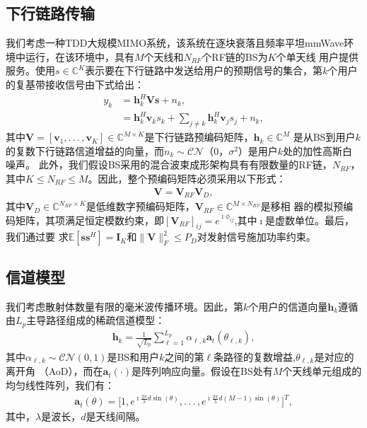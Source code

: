 \documentclass[10pt,journal,final]{IEEEtran}%
\begin{document}
\subsection{下行链路传输} %
我们考虑一种TDD大规模MIMO系统，该系统在逐块衰落且频率平坦mmWave环境中运行，在该环境中，具有$M$个天线和$N_{RF}$个RF链的BS为$K$个单天线
用户提供服务。使用$s\in\mathbb{C} ^{K}$表示要在下行链路中发送给用户的预期信号的集合，第$k$个用户的复基带接收信号由下式给出：
\vspace{-0.8em}
\begin{align}
y_{k}&=\mathbf{h}_{k}^{H} \mathbf{V} \mathbf{s} +n_{k},\nonumber\\ %
&=\mathbf{h}_{k}^{H} \mathbf{v}_{k} s_{k}+\sum_{j \neq  k}^{} \mathbf{h}_{k}^{H} \mathbf{v}_{j} s_{j}+n_{k}, %
\end{align}
其中$\mathbf{V}=[\mathbf{v}_{1},.\,.\,.\, ,\mathbf{v}_{K}]\in\mathbb{C} ^{M\times K}$是下行链路预编码矩阵，$\mathbf{h}_{k}\in\mathbb{C} ^{M}$
是从BS到用户$k$的复数下行链路信道增益的向量，而$n_{k}\sim \mathscr{C} \mathscr{N}  $（0，$\sigma^{2}$）是用户$k$处的加性高斯白噪声。
此外，我们假设BS采用的混合波束成形架构具有有限数量的RF链，$N_{RF}$，其中$K \leq  N_{RF} \leq M$。因此，整个预编码矩阵必须采用以下形式：
\begin{align}
\mathbf{V}=\mathbf{V}_{RF}\mathbf{V}_{D},
\end{align}
其中$\mathbf{V}_{D}\in\mathbb{C} ^{N_{RF}\times K}$是低维数字预编码矩阵，$\mathbf{V}_{RF}\in\mathbb{C} ^{M \times N_{RF}}$是移相
器的模拟预编码矩阵，其项满足恒定模数约束，即$[\mathbf{V}_{RF}]_{ij}=e^{\imath \phi_{ij}}$,其中$\imath$是虚数单位。最后，我们通过要
求$\mathbb{E} [\mathbf{s}\mathbf{s} ^{H}]=\mathbf{I} _{K}$和$\|\mathbf{V}\|_{F}^{2}\leq P_{D} $对发射信号施加功率约束。
\vspace{-2.3em}
\subsection[\itshape]{信道模型}
\vspace{0.005em}
我们考虑散射体数量有限的毫米波传播环境。因此，第$k$个用户的信道向量$\mathbf{h}_{k}$遵循由$L_{p}$主导路径组成的稀疏信道模型：
\begin{align}
\mathbf{h}_{k}=\frac{1}{\sqrt{L_{p}}} \sum_{\ell = 1}^{L_{p}}\alpha_{\ell,k}\mathbf{a}_{t}(\theta_{\ell,k}) ,
\end{align}
其中$\alpha_{\ell,k}\sim \mathscr{C} \mathscr{N}(0,1)$是BS和用户$k$之间的第$\ell$条路径的复数增益,$\theta_{\ell,k}$是对应的离开角
（AoD），而在$\mathbf{a}_{t}(\cdot) $是阵列响应向量。假设在BS处有$M$个天线单元组成的均匀线性阵列，我们有：
\begin{align}
\mathbf{a}_{t}(\theta)=\biggl[1,e^{\imath \frac{2\pi}{\lambda}d\sin(\theta )}, .\,.\,.\, ,
e^{\imath \frac{2\pi}{\lambda}d(M-1)\sin(\theta)}\biggr]^{T},
\end{align}
其中，$\lambda $是波长，$d$是天线间隔。
\vspace{-2.0em}
\end{document}
